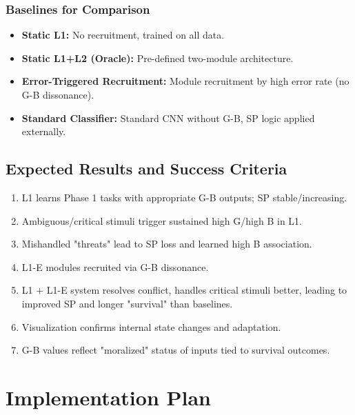 \documentclass{article}
\begin{document}
\subsubsection{Baselines for Comparison}
\begin{itemize}
    \item \textbf{Static L1:} No recruitment, trained on all data.
    \item \textbf{Static L1+L2 (Oracle):} Pre-defined two-module architecture.
    \item \textbf{Error-Triggered Recruitment:} Module recruitment by high error rate (no G-B dissonance).
    \item \textbf{Standard Classifier:} Standard CNN without G-B, SP logic applied externally.
\end{itemize}

\subsection{Expected Results and Success Criteria}
\begin{enumerate}
    \item L1 learns Phase 1 tasks with appropriate G-B outputs; SP stable/increasing.
    \item Ambiguous/critical stimuli trigger sustained high G/high B in L1.
    \item Mishandled "threats" lead to SP loss and learned high B association.
    \item L1-E modules recruited via G-B dissonance.
    \item L1 + L1-E system resolves conflict, handles critical stimuli better, leading to improved SP and longer "survival" than baselines.
    \item Visualization confirms internal state changes and adaptation.
    \item G-B values reflect "moralized" status of inputs tied to survival outcomes.
\end{enumerate}

\section{Implementation Plan}
\end{document}
